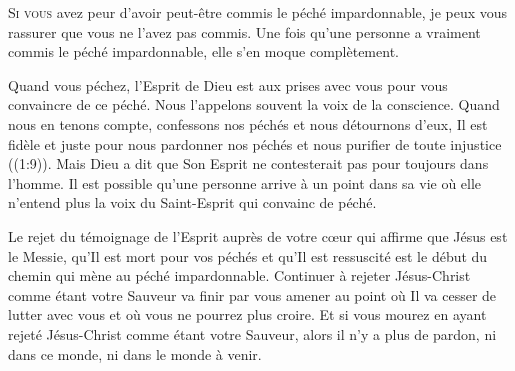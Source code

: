 


\lettrine{S}{i vous} avez peur d'avoir peut-être commis
 le péché impardonnable, je peux vous rassurer que vous ne l'avez pas commis.
 Une fois qu'une personne a vraiment commis le péché impardonnable,
 elle s'en moque complètement. 


Quand vous péchez, l'Esprit de Dieu est aux prises avec vous pour
 vous convaincre de ce péché. Nous l'appelons souvent la voix
 de la conscience. Quand nous en tenons compte, confessons nos péchés
 et nous détournons d'eux, \Og Il est fidèle et juste
 pour nous pardonner nos péchés et nous purifier de toute injustice \Fg{}
 ((1:9)).
 Mais Dieu a dit que Son Esprit ne contesterait pas pour toujours
 dans l'homme. Il est possible qu'une personne arrive à un point
 dans sa vie où elle n'entend plus la voix du Saint-Esprit 
 qui convainc de péché. 

Le rejet du témoignage de l'Esprit auprès de votre c\oe{}ur
 \ocadr qui affirme que Jésus est le Messie, qu'Il est mort pour vos péchés
 et qu'Il est ressuscité \fcadr{}
 est le début du chemin qui mène au péché impardonnable.
 Continuer à rejeter Jésus-Christ comme étant votre Sauveur
 va finir par vous amener au point où Il va cesser de lutter avec vous
 et où vous ne pourrez plus croire. Et si vous mourez 
 en ayant rejeté Jésus-Christ comme étant votre Sauveur,
 alors il n'y a plus de pardon, 
 ni dans ce monde, ni dans le monde à venir. 

\dvrule





